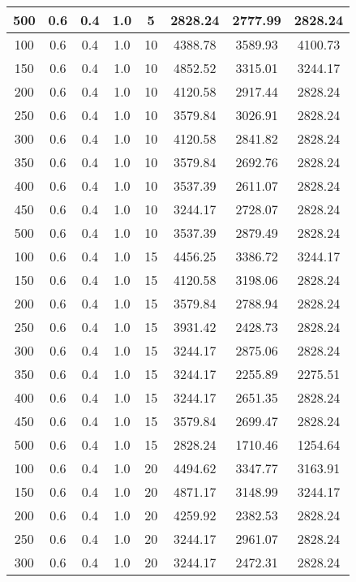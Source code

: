 \documentclass[a4paper, 12pt]{extreport}
\begin{document}
\begin{itemize}
\begin{longtable}{|c|c|c|c|c|c|c|c|}
			500 & 0.6 & 0.4 & 1.0 & 5 & 2828.24 & 2777.99 & 2828.24 \\\hline
			100 & 0.6 & 0.4 & 1.0 & 10 & 4388.78 & 3589.93 & 4100.73 \\\hline
			150 & 0.6 & 0.4 & 1.0 & 10 & 4852.52 & 3315.01 & 3244.17 \\\hline
			200 & 0.6 & 0.4 & 1.0 & 10 & 4120.58 & 2917.44 & 2828.24 \\\hline
			250 & 0.6 & 0.4 & 1.0 & 10 & 3579.84 & 3026.91 & 2828.24 \\\hline
			300 & 0.6 & 0.4 & 1.0 & 10 & 4120.58 & 2841.82 & 2828.24 \\\hline
			350 & 0.6 & 0.4 & 1.0 & 10 & 3579.84 & 2692.76 & 2828.24 \\\hline
			400 & 0.6 & 0.4 & 1.0 & 10 & 3537.39 & 2611.07 & 2828.24 \\\hline
			450 & 0.6 & 0.4 & 1.0 & 10 & 3244.17 & 2728.07 & 2828.24 \\\hline
			500 & 0.6 & 0.4 & 1.0 & 10 & 3537.39 & 2879.49 & 2828.24 \\\hline
			100 & 0.6 & 0.4 & 1.0 & 15 & 4456.25 & 3386.72 & 3244.17 \\\hline
			150 & 0.6 & 0.4 & 1.0 & 15 & 4120.58 & 3198.06 & 2828.24 \\\hline
			200 & 0.6 & 0.4 & 1.0 & 15 & 3579.84 & 2788.94 & 2828.24 \\\hline
			250 & 0.6 & 0.4 & 1.0 & 15 & 3931.42 & 2428.73 & 2828.24 \\\hline
			300 & 0.6 & 0.4 & 1.0 & 15 & 3244.17 & 2875.06 & 2828.24 \\\hline
			350 & 0.6 & 0.4 & 1.0 & 15 & 3244.17 & 2255.89 & 2275.51 \\\hline
			400 & 0.6 & 0.4 & 1.0 & 15 & 3244.17 & 2651.35 & 2828.24 \\\hline
			450 & 0.6 & 0.4 & 1.0 & 15 & 3579.84 & 2699.47 & 2828.24 \\\hline
			500 & 0.6 & 0.4 & 1.0 & 15 & 2828.24 & 1710.46 & 1254.64 \\\hline
			100 & 0.6 & 0.4 & 1.0 & 20 & 4494.62 & 3347.77 & 3163.91 \\\hline
			150 & 0.6 & 0.4 & 1.0 & 20 & 4871.17 & 3148.99 & 3244.17 \\\hline
			200 & 0.6 & 0.4 & 1.0 & 20 & 4259.92 & 2382.53 & 2828.24 \\\hline
			250 & 0.6 & 0.4 & 1.0 & 20 & 3244.17 & 2961.07 & 2828.24 \\\hline
			300 & 0.6 & 0.4 & 1.0 & 20 & 3244.17 & 2472.31 & 2828.24 \\\hline

\end{longtable}
\end{itemize}
\end{document}
